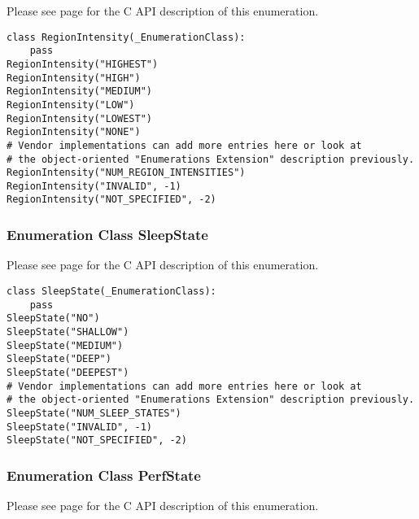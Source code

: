 Please see page \pageref{type:RegionIntensity} for the C API description of this
enumeration.

\begin{center}\begin{minipage}{.95\linewidth}\begin{lstlisting}
class RegionIntensity(_EnumerationClass):
    pass
RegionIntensity("HIGHEST")
RegionIntensity("HIGH")
RegionIntensity("MEDIUM")
RegionIntensity("LOW")
RegionIntensity("LOWEST")
RegionIntensity("NONE")
# Vendor implementations can add more entries here or look at  
# the object-oriented "Enumerations Extension" description previously. 
RegionIntensity("NUM_REGION_INTENSITIES")
RegionIntensity("INVALID", -1)
RegionIntensity("NOT_SPECIFIED", -2)
\end{lstlisting}\end{minipage}\end{center}

\subsubsection{Enumeration Class SleepState}\label{class:SleepState}

Please see page \pageref{type:SleepState} for the C API description of this
enumeration.

\begin{center}\begin{minipage}{.95\linewidth}\begin{lstlisting}
class SleepState(_EnumerationClass):
    pass
SleepState("NO")
SleepState("SHALLOW")
SleepState("MEDIUM")
SleepState("DEEP")
SleepState("DEEPEST")
# Vendor implementations can add more entries here or look at  
# the object-oriented "Enumerations Extension" description previously. 
SleepState("NUM_SLEEP_STATES")
SleepState("INVALID", -1)
SleepState("NOT_SPECIFIED", -2)
\end{lstlisting}\end{minipage}\end{center}

\subsubsection{Enumeration Class PerfState}\label{class:PerfState}

Please see page \pageref{type:PerfState} for the C API description of this
enumeration.


